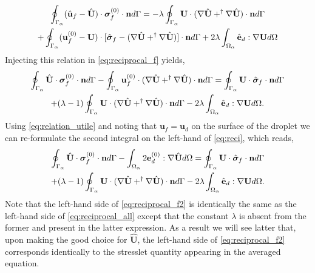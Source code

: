 \begin{multline}
    \oint_{\Gamma_{\alpha}} (\hat{\textbf{u}}_f - \hat{\textbf{U}})\cdot \bm\sigma_f^{(0)} \cdot \textbf{n} d\Gamma
    =
    - \lambda\oint_{\Gamma_{\alpha}}   \textbf{U} \cdot (\mathbf{\nabla} \hat{\textbf{U}} + ^\dagger\mathbf{\nabla} \hat{\textbf{U}})  \cdot \textbf{n} d\Gamma\\
    + \oint_{\Gamma_{\alpha}} (\textbf{u}_f^{(0)} - \textbf{U}) \cdot  [\hat{\bm\sigma}_f -(\mathbf{\nabla} \hat{\textbf{U}} + ^\dagger\mathbf{\nabla} \hat{\textbf{U}})]\cdot \textbf{n}  d\Gamma
    + 2\lambda\int_{\Omega_{\alpha}} \hat{\textbf{e}}_d : \mathbf{\nabla} \textbf{U} d\Omega 
\end{multline}
Injecting this relation in \ref{eq:reciprocal_f} yields, 
\begin{multline}
    \intS{\hat{\textbf{U}}\cdot  \bm\sigma_f^{(0)} \cdot \textbf{n}}
    - \intS{\textbf{u}_f^{(0)}\cdot  (\grad \hat{\textbf{U}} + ^\dagger\grad \hat{\textbf{U}})\cdot \textbf{n} }
    = 
    \intS{\textbf{U}\cdot  \hat{\bm\sigma}_f \cdot \textbf{n}}\\
    + (\lambda - 1)\intS{  \textbf{U} \cdot (\grad \hat{\textbf{U}} + ^\dagger\grad \hat{\textbf{U}})  \cdot \textbf{n}}
    - 2\lambda\intO{\hat{\textbf{e}}_d : \grad \textbf{U}}. 
    \label{eq:reci}
\end{multline}
Using \ref{eq:relation_utile} and noting that $\textbf{u}_f = \textbf{u}_d$ on the surface of the droplet we can re-formulate the second integral on the left-hand of \ref{eq:reci}, which reads,  
\begin{multline}
    \intS{\hat{\textbf{U}}\cdot  \bm\sigma_f^{(0)} \cdot \textbf{n}}
    - \intO{ 2\textbf{e}_d^{(0)} : \grad \hat{\textbf{U}} }
    = 
    \intS{\textbf{U}\cdot  \hat{\bm\sigma}_f \cdot \textbf{n}}\\
    + (\lambda - 1)\intS{  \textbf{U} \cdot (\grad \hat{\textbf{U}} + ^\dagger\grad \hat{\textbf{U}})  \cdot \textbf{n}}
    - 2\lambda\intO{\hat{\textbf{e}}_d : \grad \textbf{U}}. 
    \label{eq:reciprocal_f2}
\end{multline}
Note that the left-hand side of \ref{eq:reciprocal_f2} is identically the same as the left-hand side of \ref{eq:reciprocal_all} except that the constant $\lambda$ is absent from the former and present in the latter expression. 
As a result we will see latter that, upon making the good choice for $\hat{\textbf{U}}$, the left-hand side of \ref{eq:reciprocal_f2} corresponds identically to the stresslet quantity appearing in the averaged equation. 

